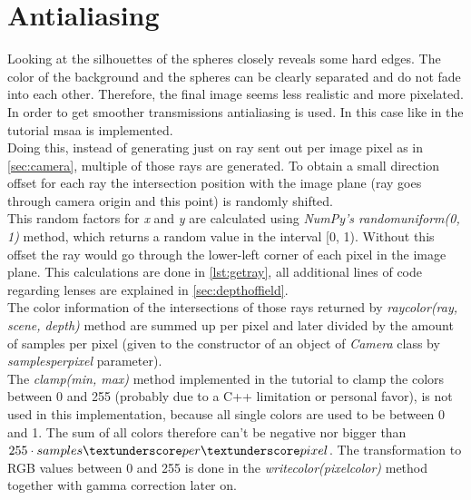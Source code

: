 \documentclass[]{article}
\begin{document}
	\section{Antialiasing}
	\label{sec:antialiasing}
	Looking at the silhouettes of the spheres closely reveals some hard edges. The color of the background and the spheres can be clearly separated and do not fade into each other. Therefore, the final image seems less realistic and more pixelated. In order to get smoother transmissions antialiasing is used. In this case like in the tutorial \ac{msaa} is implemented.
	\\
	Doing this, instead of generating just on ray sent out per image pixel as in \cref{sec:camera}, multiple of those rays are generated. To obtain a small direction offset for each ray the intersection position with the image plane (ray goes through camera origin and this point) is randomly shifted.
	\\
	This random factors for \emph{x} and \emph{y} are calculated using \emph{NumPy’s random\textunderscore uniform(0, 1)} method, which returns a random value in the interval [0, 1). Without this offset the ray would go through the lower-left corner of each pixel in the image plane. This calculations are done in \cref{lst:getray}, all additional lines of code regarding lenses are explained in \cref{sec:depthoffield}.
	\\
	The color information of the intersections of those rays returned by \emph{ray\textunderscore color(ray, scene, depth)} method are summed up per pixel and later divided by the amount of samples per pixel (given to the constructor of an object of \emph{Camera} class by \emph{samples\textunderscore per\textunderscore pixel} parameter). 
	\\
	The \emph{clamp(min, max)} method implemented in the tutorial to clamp the colors between 0 and 255 (probably due to a C++ limitation or personal favor), is not used in this implementation, because all single colors are used to be between 0 and 1. The sum of all colors therefore can’t be negative nor bigger than $255\cdot  samples\textunderscore per\textunderscore pixel$. The transformation to RGB values between 0 and 255 is done in the \emph{write\textunderscore color(pixel\textunderscore color)} method together with gamma correction later on.
	
\end{document}
